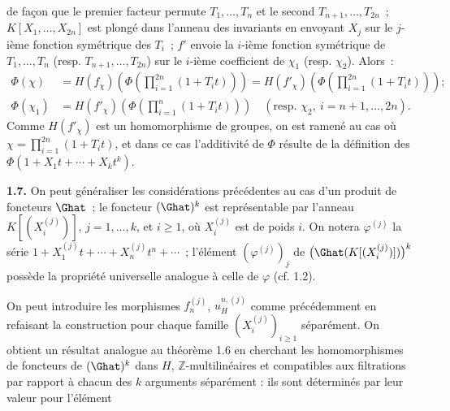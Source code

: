 de façon que le
premier facteur permute \(T_1,\ldots,T_n\) et le second \(T_{n+1},\ldots,T_{2n}\)~; \(K[X_1,\ldots,X_{2n}]\) est plongé dans l'anneau des invariants en envoyant \(X_j\) sur le \(j\)-ième fonction symétrique des \(T_i\)~; \(f'\) envoie la \(i\)-ième fonction symétrique de \(T_1,\ldots,T_n\) (resp. \(T_{n+1},\ldots,T_{2n}\)) sur le \(i\)-ième coefficient de \(\chi_1\) (resp. \(\chi_2\)). Alors~:
\[
\begin{aligned}
\Phi(\chi)
&=H(f_\chi)\left(\Phi\left(\prod_{i=1}^{2n}(1+T_it)\right)\right)
=H(f'_\chi)\left(\Phi\left(\prod_{i=1}^{2n}(1+T_it)\right)\right);\\
\Phi(\chi_1) &=H(f'_\chi)\left(\Phi\left(\prod_{i=1}^{n}(1+T_it)\right)\right)\quad(\text{resp. }\chi_2,\ i=n+1,\ldots,2n).
\end{aligned}
\]
Comme \(H(f'_\chi)\) est un homomorphisme de groupes, on est ramené au cas où \(\chi=\prod_{i=1}^{2n}(1+T_it)\), et dans ce cas l'additivité de \(\Phi\) résulte de la définition des \(\Phi(1+X_1t+\cdots+X_k t^k)\).

\textbf{1.7.} On peut généraliser les considérations précédentes au cas d'un produit de foncteurs \(\Ghat\)~; le foncteur \((\Ghat)^k\) est représentable par l'anneau
\(K[(X_i^{(j)})]\), \(j=1,\ldots,k\), et \(i\geq 1\), où \(X_i^{(j)}\) est de poids \(i\). On notera \(\varphi^{(j)}\) la série \(1+X_1^{(j)}t+\cdots+X_n^{(j)}t^n+\cdots\)~; l'élément \((\varphi^{(j)})_j\) de \(\bigl(\Ghat(K[(X_i^{(j)})])\bigr)^k\) possède la propriété universelle analogue à celle de \(\varphi\) (cf. 1.2).

On peut introduire les morphismes \(f_n^{(j)}\), \(u_H^{n,(j)}\) comme précédemment en refaisant la construction pour chaque famille \((X_i^{(j)})_{i\geq 1}\) séparément. On obtient un résultat analogue au théorème 1.6 en cherchant les homomorphismes de foncteurs de \((\Ghat)^k\) dans \(H\), \(\mathbb Z\)-multilinéaires et compatibles aux filtrations par rapport à chacun des \(k\) arguments séparément : ils sont déterminés par leur valeur pour l'élément
